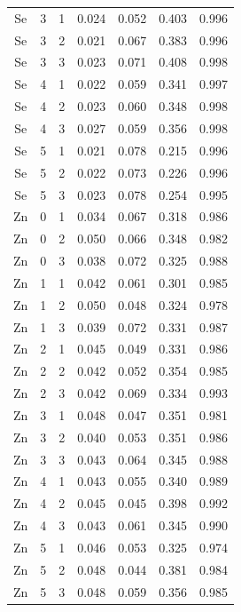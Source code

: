\documentclass[ms, hidelinks]{uncgdissertationexp}
\theoremstyle{plain}
\theoremstyle{definition}
\theoremstyle{remark}
\begin{document}
\begin{longtable}{ccccccc}
Se & 3 & 1 & 0.024 & 0.052 & 0.403 & 0.996\\
\rowcolor{gray!6}  Se & 3 & 2 & 0.021 & 0.067 & 0.383 & 0.996\\
Se & 3 & 3 & 0.023 & 0.071 & 0.408 & 0.998\\
\rowcolor{gray!6}  Se & 4 & 1 & 0.022 & 0.059 & 0.341 & 0.997\\
Se & 4 & 2 & 0.023 & 0.060 & 0.348 & 0.998\\
\rowcolor{gray!6}  Se & 4 & 3 & 0.027 & 0.059 & 0.356 & 0.998\\
Se & 5 & 1 & 0.021 & 0.078 & 0.215 & 0.996\\
\rowcolor{gray!6}  Se & 5 & 2 & 0.022 & 0.073 & 0.226 & 0.996\\
Se & 5 & 3 & 0.023 & 0.078 & 0.254 & 0.995\\
\rowcolor{gray!6}  Zn & 0 & 1 & 0.034 & 0.067 & 0.318 & 0.986\\
Zn & 0 & 2 & 0.050 & 0.066 & 0.348 & 0.982\\
\rowcolor{gray!6}  Zn & 0 & 3 & 0.038 & 0.072 & 0.325 & 0.988\\
Zn & 1 & 1 & 0.042 & 0.061 & 0.301 & 0.985\\
\rowcolor{gray!6}  Zn & 1 & 2 & 0.050 & 0.048 & 0.324 & 0.978\\
Zn & 1 & 3 & 0.039 & 0.072 & 0.331 & 0.987\\
\rowcolor{gray!6}  Zn & 2 & 1 & 0.045 & 0.049 & 0.331 & 0.986\\
Zn & 2 & 2 & 0.042 & 0.052 & 0.354 & 0.985\\
\rowcolor{gray!6}  Zn & 2 & 3 & 0.042 & 0.069 & 0.334 & 0.993\\
Zn & 3 & 1 & 0.048 & 0.047 & 0.351 & 0.981\\
\rowcolor{gray!6}  Zn & 3 & 2 & 0.040 & 0.053 & 0.351 & 0.986\\
Zn & 3 & 3 & 0.043 & 0.064 & 0.345 & 0.988\\
\rowcolor{gray!6}  Zn & 4 & 1 & 0.043 & 0.055 & 0.340 & 0.989\\
Zn & 4 & 2 & 0.045 & 0.045 & 0.398 & 0.992\\
\rowcolor{gray!6}  Zn & 4 & 3 & 0.043 & 0.061 & 0.345 & 0.990\\
Zn & 5 & 1 & 0.046 & 0.053 & 0.325 & 0.974\\
\rowcolor{gray!6}  Zn & 5 & 2 & 0.048 & 0.044 & 0.381 & 0.984\\
Zn & 5 & 3 & 0.048 & 0.059 & 0.356 & 0.985\\*
\end{longtable}
\clearpage
\end{document}
